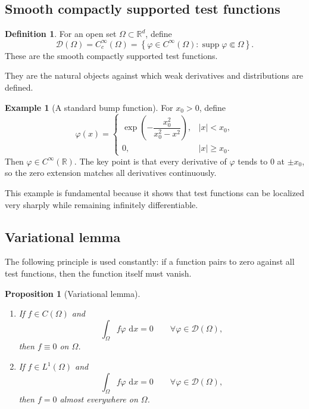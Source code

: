 \documentclass[11pt]{article}
\newtheorem{proposition}[theorem]{Proposition}
\theoremstyle{definition}
\newtheorem{definition}[theorem]{Definition}
\newtheorem{example}[theorem]{Example}
\newcommand{\R}{\mathbb{R}}
\newcommand{\dd}{\,\mathrm{d}}
\newcommand{\abs}[1]{\left\lvert #1\right\rvert}
\newcommand{\set}[1]{\left\{ #1\right\}}
\DeclareMathOperator{\supp}{supp}
\begin{document}
\subsection{Smooth compactly supported test functions}

\begin{definition}
For an open set $\Omega\subset\R^d$, define
\[
\mathscr{D}(\Omega)=C_c^\infty(\Omega)
= \set{\varphi\in C^\infty(\Omega): \supp \varphi \Subset \Omega}.
\]
These are the smooth compactly supported test functions.
\end{definition}

They are the natural objects against which weak derivatives and distributions are defined.

\begin{example}[A standard bump function]
For $x_0>0$, define
\[
\varphi(x)=
\begin{cases}
\exp\!\left(-\dfrac{x_0^2}{x_0^2-x^2}\right), & \abs{x}<x_0,\\
0, & \abs{x}\ge x_0.
\end{cases}
\]
Then $\varphi\in C^\infty(\R)$. The key point is that every derivative of $\varphi$ tends to $0$ at $\pm x_0$, so the zero extension matches all derivatives continuously.
\end{example}

This example is fundamental because it shows that test functions can be localized very sharply while remaining infinitely differentiable.

\subsection{Variational lemma}

The following principle is used constantly: if a function pairs to zero against all test functions, then the function itself must vanish.

\begin{proposition}[Variational lemma]
\leavevmode
\begin{enumerate}[label=(\alph*)]
    \item If $f\in C(\Omega)$ and
    \[
    \int_\Omega f\varphi\,\dd x = 0 \qquad \forall \varphi\in \mathscr{D}(\Omega),
    \]
    then $f\equiv 0$ on $\Omega$.
    \item If $f\in L^1(\Omega)$ and
    \[
    \int_\Omega f\varphi\,\dd x = 0 \qquad \forall \varphi\in \mathscr{D}(\Omega),
    \]
    then $f=0$ almost everywhere on $\Omega$.
\end{enumerate}
\end{proposition}
\end{document}
